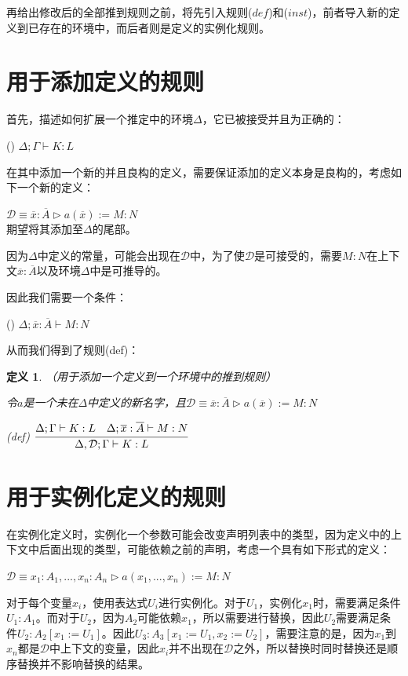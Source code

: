 \documentclass[UTF8]{article}
\newtheorem{thm}{定义}[section]
\newcommand{\rmnum}[1]{\romannumeral #1}
\begin{document}
		再给出修改后的全部推到规则之前，将先引入规则($def$)和($inst$)，前者导入新的定义到已存在的环境中，而后者则是定义的实例化规则。
		
	\section{用于添加定义的规则}
	\noindent
	首先，描述如何扩展一个推定中的环境$\Delta$，它已被接受并且为正确的：
	
		(\rmnum{1}) $\Delta;\Gamma\vdash K:L$
		
		在其中添加一个新的并且良构的定义，需要保证添加的定义本身是良构的，考虑如下一个新的定义：
		
		$\mathcal{D}\equiv\overline{x}:\overline{A}\triangleright a(\overline{x}):=M:N$\\
		期望将其添加至$\Delta$的尾部。
		
		因为$\Delta$中定义的常量，可能会出现在$\mathcal{D}$中，为了使$\mathcal{D}$是可接受的，需要$M:N$在上下文$\overline{x}:\overline{A}$以及环境$\Delta$中是可推导的。
		
		因此我们需要一个条件：
		
		(\rmnum{2}) $\Delta;\overline{x}:\overline{A}\vdash M:N$
		
		从而我们得到了规则(def)：
		
		\begin{thm}（用于添加一个定义到一个环境中的推到规则）
			
			\noindent
			令$a$是一个未在$\Delta$中定义的新名字，且$\mathcal{D}\equiv\overline{x}:\overline{A}\triangleright a(\overline{x}):=M:N$
			
			(def) $\cfrac{\Delta;\Gamma\vdash K:L\ \ \ \Delta;\overline{x}:\overline{A}\vdash M:N}{\Delta,\mathcal{D};\Gamma\vdash K:L}$
		\end{thm}

	\section{用于实例化定义的规则}
	\noindent
	在实例化定义时，实例化一个参数可能会改变声明列表中的类型，因为定义中的上下文中后面出现的类型，可能依赖之前的声明，考虑一个具有如下形式的定义：
	
		$\mathcal{D}\equiv x_1:A_1,...,x_n:A_n\triangleright a(x_1,...,x_n):=M:N$
		
		对于每个变量$x_i$，使用表达式$U_i$进行实例化。对于$U_1$，实例化$x_1$时，需要满足条件$U_1:A_1$。而对于$U_2$，因为$A_2$可能依赖$x_1$，所以需要进行替换，因此$U_2$需要满足条件$U_2:A_2\left[x_1:=U_1\right]$。因此$U_3:A_3\left[x_1:=U_1,x_2:=U_2\right]$，需要注意的是，因为$x_1$到$x_n$都是$\mathcal{D}$中上下文的变量，因此$x_i$并不出现在$\mathcal{D}$之外，所以替换时同时替换还是顺序替换并不影响替换的结果。
		
\end{document}
